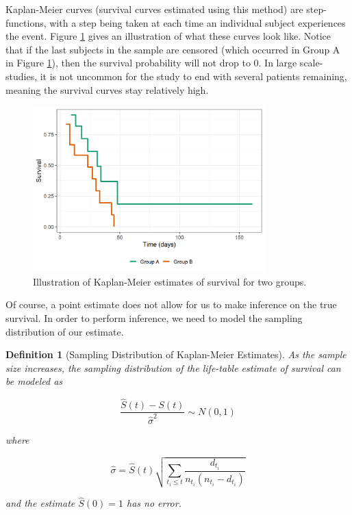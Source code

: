 \documentclass[
]{book}
\theoremstyle{plain}
\theoremstyle{mydefn}
\newtheorem{definition}{Definition}[chapter]
\theoremstyle{myexmpl}
\theoremstyle{remark}
\begin{document}
Kaplan-Meier curves (survival curves estimated using this method) are step-functions, with a step being taken at each time an individual subject experiences the event. Figure \ref{fig:surv-km-curves} gives an illustration of what these curves look like. Notice that if the last subjects in the sample are censored (which occurred in Group A in Figure \ref{fig:surv-km-curves}), then the survival probability will not drop to 0. In large scale-studies, it is not uncommon for the study to end with several patients remaining, meaning the survival curves stay relatively high.

\begin{figure}

{\centering \includegraphics[width=0.8\textwidth]{./Images/surv-km-curves-1} 

}

\caption{Illustration of Kaplan-Meier estimates of survival for two groups.}\label{fig:surv-km-curves}
\end{figure}

Of course, a point estimate does not allow for us to make inference on the true survival. In order to perform inference, we need to model the sampling distribution of our estimate.

\begin{definition}[Sampling Distribution of Kaplan-Meier Estimates]
As the sample size increases, the sampling distribution of the life-table estimate of survival can be modeled as

\[\frac{\widehat{S}(t) - S(t)}{\widehat{\sigma}^2} \sim N(0, 1)\]

where

\[\widehat{\sigma} = \widehat{S}(t) \sqrt{\sum\limits_{t_i \leq t} \frac{d_{t_i}}{n_{t_i} \left(n_{t_i} - d_{t_i}\right)}}\]

and the estimate \(\widehat{S}(0) = 1\) has no error.
\end{definition}
\end{document}
